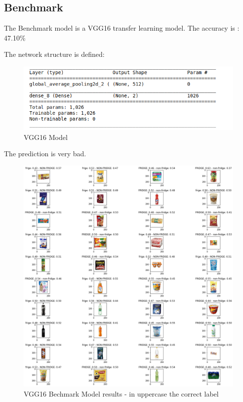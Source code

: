 \documentclass[a4paper,10pt]{article}
\begin{document}
\subsection{Benchmark}


The Benchmark model is a VGG16 transfer learning model. The accuracy is : 47.10\%

The network structure is defined: 

\begin{figure}[ht]
  \includegraphics[width=\linewidth]{vgg16_model.png}
  \caption{VGG16 Model}
\end{figure}


The prediction is very bad. 

\begin{figure}[ht]
  \includegraphics[width=\linewidth]{vgg16_results.png}
  \caption{VGG16 Bechmark Model results - in uppercase the correct label}
\end{figure}
\end{document}

